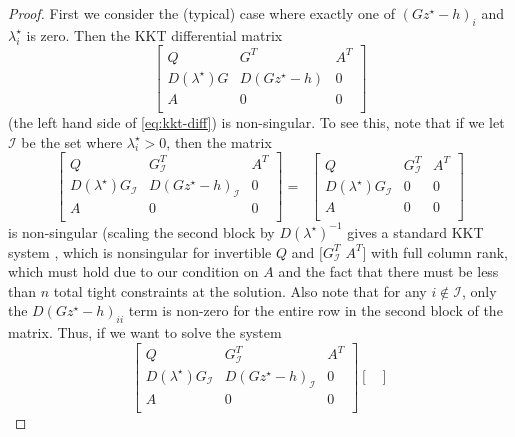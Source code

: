 \begin{proof}
  First we consider the (typical) case where exactly one of $(Gz^\star - h)_i$
  and $\lambda^\star_i$ is zero.  Then the KKT differential matrix
  \begin{equation}
    \begin{bmatrix}
      Q & G^T & A^T \\
      D(\lambda^\star)G  & D(Gz^\star-h) & 0 \\
      A & 0 & 0 \\
    \end{bmatrix}
  \end{equation}
  (the left hand side of \eqref{eq:kkt-diff}) is non-singular.  To see this,
  note that if we let $\mathcal{I}$ be the set where $\lambda^\star_i  > 0$,
  then the matrix
  \begin{equation}
    \begin{bmatrix}
      Q & G_{\mathcal{I}}^T & A^T \\
      D(\lambda^\star)G_{\mathcal{I}}  & D(Gz^\star-h)_{\mathcal{I}} & 0 \\
      A & 0 & 0 \\
    \end{bmatrix}
    = \;\; \begin{bmatrix}
      Q & G_{\mathcal{I}}^T & A^T \\
      D(\lambda^\star)G_{\mathcal{I}}  & 0 & 0 \\
      A & 0 & 0 \\
    \end{bmatrix}
  \end{equation}
  is non-singular (scaling the second block by $D(\lambda^\star)^{-1}$ gives a
  standard KKT system \citep[Section 10.4]{boyd2004convex}, which is nonsingular
  for invertible $Q$ and $[G_\mathcal{I}^T$ \; $A^T]$ with full column rank,
  which must hold due to our condition on $A$ and the fact that there must be
  less than $n$ total tight constraints at the solution.  Also note that for any
  $i \not \in \mathcal{I}$, only the
  $D(Gz^\star -h)_{ii}$ term is non-zero for the entire row in the second block
  of the matrix.  Thus, if we want to solve the system
  \begin{equation}
    \begin{bmatrix}
      Q & G_{\mathcal{I}}^T & A^T \\
      D(\lambda^\star)G_{\mathcal{I}}  & D(Gz^\star-h)_{\mathcal{I}} & 0 \\
      A & 0 & 0 \\
    \end{bmatrix}
    \begin{bmatrix}

\end{bmatrix}
\end{equation}
\end{proof}
